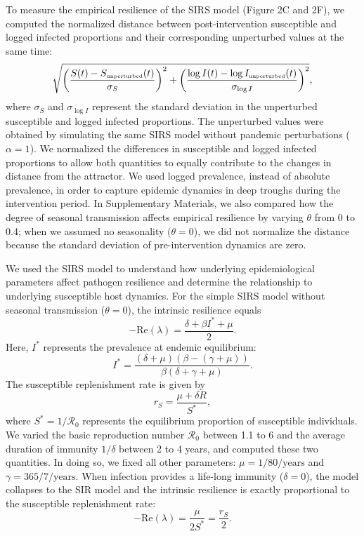 \documentclass[12pt]{article}
\newcommand{\tsub}[2]{#1_{{\textrm{\tiny #2}}}}
\begin{document}
To measure the empirical resilience of the SIRS model (Figure 2C and 2F), we computed the normalized distance between post-intervention susceptible and logged infected proportions and their corresponding unperturbed values at the same time:
\begin{equation}
\sqrt{\left(\frac{S(t) - \tsub{S}{unperturbed}(t)}{\sigma_S}\right)^2 + \left(\frac{\log I(t) - \log \tsub{I}{unperturbed}(t)}{\sigma_{\log I}}\right)^2},
\end{equation}
where $\sigma_S$ and $\sigma_{\log I}$ represent the standard deviation in the unperturbed susceptible and logged infected proportions.
The unperturbed values were obtained by simulating the same SIRS model without pandemic perturbations ($\alpha = 1$).
We normalized the differences in susceptible and logged infected proportions to allow both quantities to equally contribute to the changes in distance from the attractor.
We used logged prevalence, instead of absolute prevalence, in order to capture epidemic dynamics in deep troughs during the intervention period.
In Supplementary Materials, we also compared how the degree of seasonal transmission affects empirical resilience by varying $\theta$ from 0 to 0.4; when we assumed no seasonality ($\theta = 0$), we did not normalize the distance because the standard deviation of pre-intervention dynamics are zero. 

We used the SIRS model to understand how underlying epidemiological parameters affect pathogen resilience and determine the relationship to underlying susceptible host dynamics.
For the simple SIRS model without seasonal transmission ($\theta = 0$), the intrinsic resilience equals
\begin{equation}
-\mathrm{Re}(\lambda) = \frac{\delta + \beta I^{\ast} + \mu}{2}.
\end{equation}
Here, $I^{\ast}$ represents the prevalence at endemic equilibrium:
\begin{equation}
I^{\ast} = \frac{(\delta + \mu)(\beta - (\gamma + \mu))}{\beta(\delta + \gamma + \mu)}.
\end{equation}
The susceptible replenishment rate is given by
\begin{equation}
r_S = \frac{\mu + \delta R}{S^\ast},
\end{equation}
where $S^\ast = 1/\mathcal R_0$ represents the equilibrium proportion of susceptible individuals.
We varied the basic reproduction number $\mathcal R_0$ between 1.1 to 6 and the average duration of immunity $1/\delta$ between 2 to 4 years, and computed these two quantities.
In doing so, we fixed all other parameters: $\mu=1/80/\mathrm{years}$ and $\gamma=365/7/\mathrm{years}$.
When infection provides a life-long immunity ($\delta = 0$), the model collapses to the SIR model and the intrinsic resilience is exactly proportional to the susceptible replenishment rate:
\begin{equation}
-\mathrm{Re}(\lambda) = \frac{\mu}{2 S^\ast} = \frac{r_S}{2}.
\end{equation}
\end{document}
